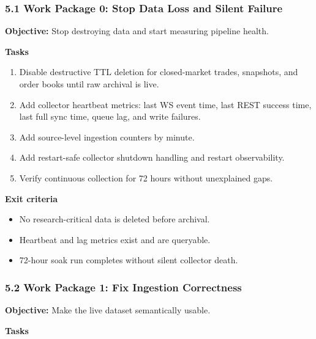\documentclass[
]{article}
\providecommand{\tightlist}{%
  \setlength{\itemsep}{0pt}\setlength{\parskip}{0pt}}
\begin{document}
\subsubsection{5.1 Work Package 0: Stop Data Loss and Silent
Failure}\label{51-work-package-0-stop-data-loss-and-silent-failure}

\textbf{Objective:} Stop destroying data and start measuring pipeline
health.

\textbf{Tasks}

\begin{enumerate}
\def\labelenumi{\arabic{enumi}.}
\tightlist
\item
  Disable destructive TTL deletion for closed-market trades, snapshots,
  and order books until raw archival is live.
\item
  Add collector heartbeat metrics: last WS event time, last REST success
  time, last full sync time, queue lag, and write failures.
\item
  Add source-level ingestion counters by minute.
\item
  Add restart-safe collector shutdown handling and restart
  observability.
\item
  Verify continuous collection for 72 hours without unexplained gaps.
\end{enumerate}

\textbf{Exit criteria}

\begin{itemize}
\tightlist
\item
  No research-critical data is deleted before archival.
\item
  Heartbeat and lag metrics exist and are queryable.
\item
  72-hour soak run completes without silent collector death.
\end{itemize}

\subsubsection{5.2 Work Package 1: Fix Ingestion
Correctness}\label{52-work-package-1-fix-ingestion-correctness}

\textbf{Objective:} Make the live dataset semantically usable.

\textbf{Tasks}
\end{document}
